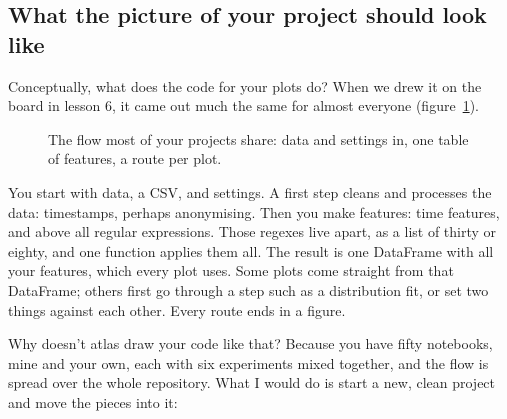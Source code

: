 \documentclass[12pt, a4paper]{article}
\theoremstyle{definition}
\theoremstyle{remark}
\begin{document}
\subsection{What the picture of your project should look like}
\label{sec:atlas-project}
Conceptually, what does the code for your plots do? When we drew it on the board in lesson 6, it came out much the same for almost everyone (figure~\ref{fig:atlas-project}).

\begin{figure}[H]
\centering
{}
\caption{The flow most of your projects share: data and settings in, one table of features, a route per plot.}
\label{fig:atlas-project}
\end{figure}

You start with data, a CSV, and settings. A first step cleans and processes the data: timestamps, perhaps anonymising. Then you make features: time features, and above all regular expressions. Those regexes live apart, as a list of thirty or eighty, and one function applies them all. The result is one DataFrame with all your features, which every plot uses. Some plots come straight from that DataFrame; others first go through a step such as a distribution fit, or set two things against each other. Every route ends in a figure.

Why doesn't atlas draw your code like that? Because you have fifty notebooks, mine and your own, each with six experiments mixed together, and the flow is spread over the whole repository. What I would do is start a new, clean project and move the pieces into it:
\end{document}
